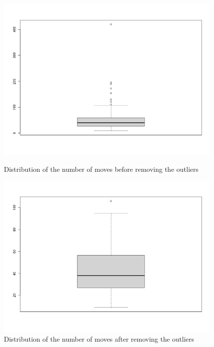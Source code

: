 \begin{figure}[tpb]
\centering
	\begin{minipage}[b]{0.46\columnwidth}
	\includegraphics[width=\columnwidth]{img/outliers_vid.png}
	\caption{Distribution of the number of moves before removing the outliers}			
	\label{fig:b7}
	\end{minipage}
	\quad
	\begin{minipage}[b]{0.50\columnwidth}
	\includegraphics[width=\columnwidth]{img/outliers_fixed_vid.png}
	\caption{Distribution of the number of moves after removing the outliers}
	\label{fig:b8}
	\end{minipage}
\end{figure}

